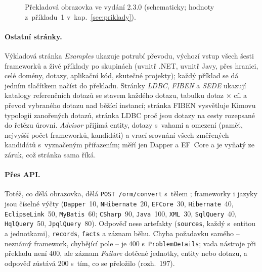 \documentclass{article}
\begin{document}
\begin{figure}[htbp]
\caption{Překladová obrazovka ve vydání 2.3.0 (schematicky; hodnoty z~příkladu~1 v~kap.~\ref{sec:priklady}).}
\label{fig:tutorial}
\end{figure}

\paragraph{Ostatní stránky.} Výkladová stránka \emph{Examples} ukazuje potrubí převodu, výchozí vstup všech šesti frameworků a živé příklady po skupinách (uvnitř .NET, uvnitř Javy, přes hranici, celé domény, dotazy, aplikační kód, skutečné projekty); každý příklad se dá jedním tlačítkem načíst do překladu. Stránky \emph{LDBC}, \emph{FIBEN} a \emph{SEDE} ukazují katalogy referenčních dotazů se stavem každého dotazu, tabulku dotaz × cíl a převod vybraného dotazu nad běžící instancí; stránka FIBEN vysvětluje Kimovu typologii zanořených dotazů, stránka LDBC proč jsou dotazy na cesty rozepsané do řetězu úrovní. \emph{Advisor} přijímá entity, dotazy s~vahami a omezení (paměť, nejvyšší počet frameworků, kandidáti) a vrací srovnání všech změřených kandidátů s~vyznačeným přiřazením; měří jen Dapper a EF~Core a je vyňatý ze záruk, což stránka sama říká.

\paragraph{Přes API.} Totéž, co dělá obrazovka, dělá \texttt{POST /orm/convert} s~tělem ; frameworky i jazyky jsou číselné výčty (\texttt{Dapper}~10, \texttt{NHibernate}~20, \texttt{EFCore}~30, \texttt{Hibernate}~40, \texttt{EclipseLink}~50, \texttt{MyBatis}~60; \texttt{CSharp}~90, \texttt{Java}~100, \texttt{XML}~30, \texttt{SqlQuery}~40, \texttt{HqlQuery}~50, \texttt{JpqlQuery}~80). Odpověď nese artefakty (\texttt{sources}, každý s~entitou a jednotkami), \texttt{records}, \texttt{facts} a záznam běhu. Chyba požadavku samého -- neznámý framework, chybějící pole -- je 400 s~\texttt{ProblemDetails}; vada nástroje při překladu není 400, ale záznam \emph{Failure} dotčené jednotky, entity nebo dotazu, a odpověď zůstává 200 s~tím, co se přeložilo (rozh.~197).
\end{document}
